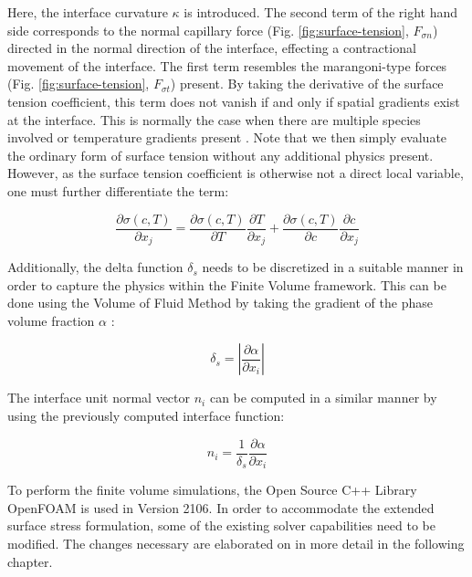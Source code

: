 \documentclass[conference,final]{IEEEtran}
\begin{document}
Here, the interface curvature $\kappa$ is introduced. The second term of the right hand side corresponds to the normal capillary force (Fig. \ref{fig:surface-tension}, $F_{\sigma n}$) directed in the normal direction of the interface, effecting a contractional movement of the interface. The first term resembles the marangoni-type forces (Fig. \ref{fig:surface-tension}, $F_{\sigma t}$) present. By taking the derivative of the surface tension coefficient, this term does not vanish if and only if spatial gradients exist at the interface. This is normally the case when there are multiple species involved or temperature gradients present \cite{j.straubThermokapillareGrenzflachenkonvektionGasblasen1990}. Note that we then simply evaluate the ordinary form of surface tension without any additional physics present. However, as the surface tension coefficient is otherwise not a direct local variable, one must further differentiate the term:

\begin{equation}
    \frac{\partial \sigma(c,T)}{\partial x_j} = \frac{\partial \sigma(c,T)}{\partial T} \frac{\partial T}{\partial x_j} + \frac{\partial \sigma(c,T)}{\partial c} \frac{\partial c}{\partial x_j}
    \label{eq:sigmadiff}
\end{equation}

Additionally, the delta function $\delta_s$ needs to be discretized in a suitable manner in order to capture the physics within the Finite Volume framework. This can be done using the Volume of Fluid Method by taking the gradient of the phase volume fraction $\alpha$ \cite{gueyffierVolumeofFluidInterfaceTracking1999,hirtVolumeFluidVOF1981}:

\begin{equation}
    \delta_s = \left\lvert \frac{\partial \alpha}{\partial x_i} \right\rvert
\end{equation}

The interface unit normal vector $n_i$ can be computed in a similar manner by using the previously computed interface function:

\begin{equation}
    n_i = \frac{1}{\delta_s} \frac{\partial \alpha}{\partial x_i}
\end{equation}

To perform the finite volume simulations, the Open Source C++ Library OpenFOAM is used in Version 2106. In order to accommodate the extended surface stress formulation, some of the existing solver capabilities need to be modified. The changes necessary are elaborated on in more detail in the following chapter.
\end{document}

